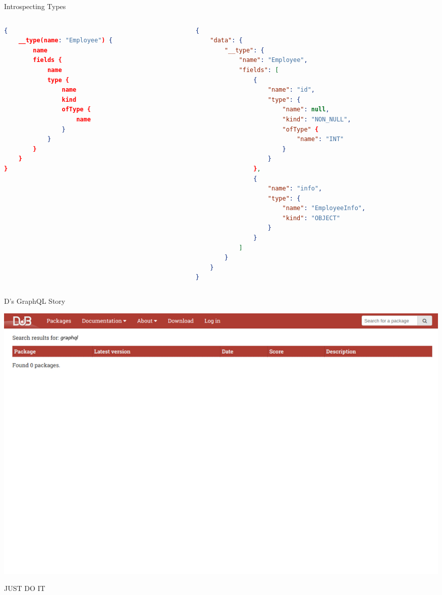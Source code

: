 \documentclass[aspectratio=169,notes]{beamer}
\begin{document}
	\begin{frame}[fragile]{Introspecting Types}
		\vspace{-7mm}	
		\begin{columns}[t]
			\begin{column}{0.5\textwidth}
				\begin{lstlisting}[language=json,basicstyle=\scriptsize\ttfamily]
{
	__type(name: "Employee") {
		name
		fields {
			name
			type {
				name
				kind
				ofType {
					name
				}
			}
		}
	}
}
\end{lstlisting}	
			\end{column}
			\begin{column}{0.5\textwidth}
				\begin{lstlisting}[language=json,basicstyle=\scriptsize\ttfamily]
{
	"data": {
		"__type": {
			"name": "Employee",
			"fields": [
				{
					"name": "id",
					"type": {
						"name": null,
						"kind": "NON_NULL",
						"ofType" {
							"name": "INT"
						}
					}
				},
				{
					"name": "info",
					"type": {
						"name": "EmployeeInfo",
						"kind": "OBJECT"
					}
				}
			]
		}
	}
}
\end{lstlisting}	
			\end{column}
			
		\end{columns}
	\end{frame}

	\begin{frame}[fragile]{D's GraphQL Story}
		\begin{center}
			\includegraphics{graphqlsearch.jpg}	
		\end{center}	
	\end{frame}

	\begin{frame}{JUST DO IT}
		\begin{center}
		\end{center}
	\end{frame}
\end{document}
